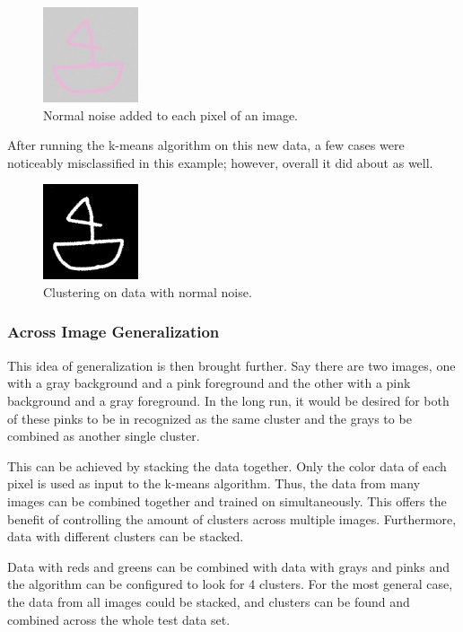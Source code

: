 \documentclass[12pt]{article}
\begin{document}
\begin{multicols}{2}
\begin{figure}[H]
\centering
\includegraphics[width=0.25\textwidth]{img/noise_data2.png}
\caption{Normal noise added to each pixel of an image.}
\label{fig:noise1}
\end{figure}

After running the k-means algorithm on this new data, a few cases were noticeably misclassified in this example; however, overall it did about as well.

\begin{figure}[H]
	\centering
	\includegraphics[width=0.25\textwidth]{img/noise_data2_bwnoise.png}
	\caption{Clustering on data with normal noise.}
	\label{fig:noise2}
\end{figure}



\subsubsection{Across Image Generalization}
This idea of generalization is then brought further. Say there are two images, one with a gray background and a pink foreground and the other with a pink background and a gray foreground. In the long run, it would be desired for both of these pinks to be in recognized as the same cluster and the grays to be combined as another single cluster. 

This can be achieved by stacking the data together. Only the color data of each pixel is used as input to the k-means algorithm. Thus, the data from many images can be combined together and trained on simultaneously. This offers the benefit of controlling the amount of clusters across multiple images. Furthermore, data with different clusters can be stacked.

Data with reds and greens can be combined with data with grays and pinks and the algorithm can be configured to look for 4 clusters. For the most general case, the data from all images could be stacked, and clusters can be found and combined across the whole test data set.


\end{multicols}
\end{document}
